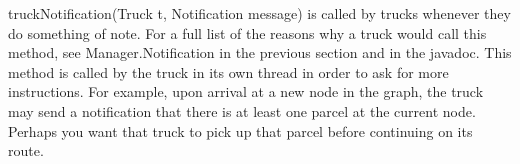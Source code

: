\documentclass[11pt]{article}
\begin{document}
truckNotification(Truck t, Notification message) is called by trucks whenever they do something of note. For a full list of the reasons why a truck would call this method, see Manager.Notification in the previous section and in the javadoc. This method is called by the truck in its own thread in order to ask for more instructions. For example, upon arrival at a new node in the graph, the truck may send a notification that there is at least one parcel at the current node. Perhaps you want that truck to pick up that parcel before continuing on its route.
\end{document}
